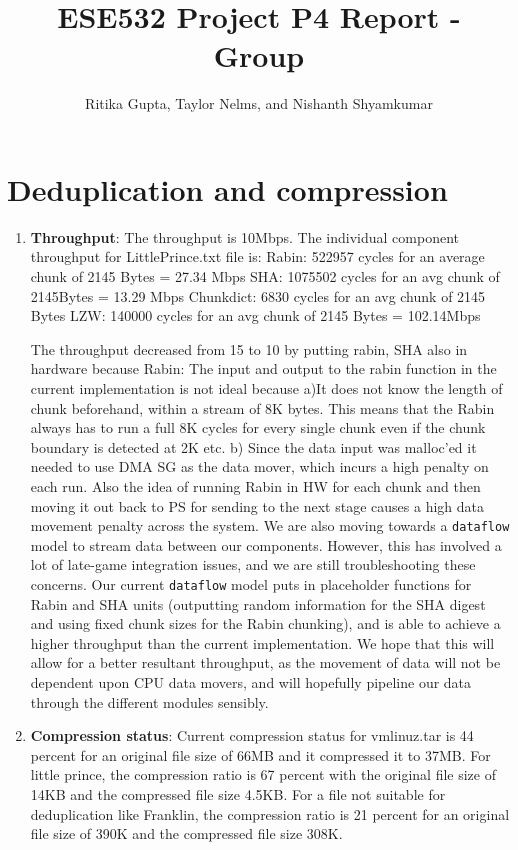 \documentclass{article}
\title{ESE532 Project P4 Report - Group}
\author{Ritika Gupta, Taylor Nelms, and Nishanth Shyamkumar}
\begin{document}
\maketitle


\section{Deduplication and compression}
\begin{enumerate}
\item%
\textbf{Throughput}: The throughput is 10Mbps. The individual component throughput for LittlePrince.txt file is:
Rabin: 522957 cycles for an average chunk of 2145 Bytes = 27.34 Mbps 
SHA: 1075502 cycles for an avg chunk of 2145Bytes  = 13.29 Mbps
Chunkdict: 6830 cycles for an avg chunk of 2145 Bytes 
LZW: 140000 cycles for an avg chunk of 2145 Bytes = 102.14Mbps

The throughput decreased from 15 to 10 by putting rabin, SHA also in hardware because 
Rabin: The input and output to the rabin function in the current implementation is not ideal because 
a)It does not know the length of chunk beforehand, within a stream of 8K bytes. This means that the Rabin always has to run a full 8K cycles for every single chunk even if the chunk boundary is detected at 2K etc.
b) Since the data input was malloc'ed it needed to use DMA SG as the data mover, which incurs a high penalty on each run. Also the idea of running Rabin in HW for each chunk and then moving it out back to PS for sending to the next stage causes a high data movement penalty across the system. 
\newline\newline
We are also moving towards a \texttt{dataflow} model to stream data between our components. However, this has involved a lot of late-game integration issues, and we are still troubleshooting these concerns. 
Our current \texttt{dataflow} model puts in placeholder functions for Rabin and SHA units (outputting random information for the SHA digest and using fixed chunk sizes for the Rabin chunking), and is able to achieve a higher throughput than the current implementation. 
We hope that this will allow for a better resultant throughput, as the movement of data will not be dependent upon CPU data movers, and will hopefully pipeline our data through the different modules sensibly.
\newline

\item%
\textbf{Compression status}: Current compression status for vmlinuz.tar is 44 percent for an original file size of 66MB and it compressed it to 37MB. For little prince, the compression ratio is 67 percent with the original file size of 14KB and the compressed file size 4.5KB. For a file not suitable for deduplication like Franklin, the compression ratio is 21 percent for an original file size of 390K and the compressed file size 308K.
\newline


\end{enumerate}
\end{document}
